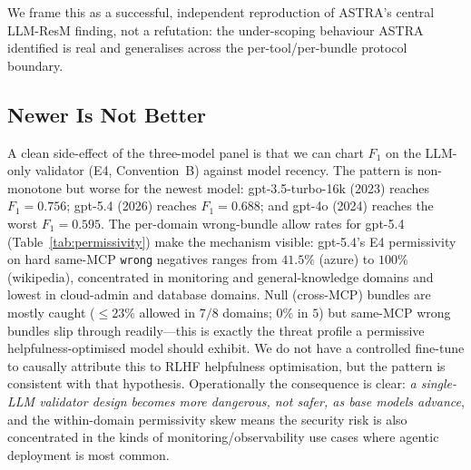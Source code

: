 \documentclass[10pt,a4paper,twocolumn]{article}
\begin{document}
We frame this as a successful, independent reproduction of ASTRA's central LLM-ResM finding, not a refutation: the under-scoping behaviour ASTRA identified is real and generalises across the per-tool/per-bundle protocol boundary.

\subsection{Newer Is Not Better}
\label{sec:newer_not_better}

A clean side-effect of the three-model panel is that we can chart $F_1$ on the LLM-only validator (E4, Convention~B) against model recency. The pattern is non-monotone but worse for the newest model: gpt-3.5-turbo-16k (2023) reaches $F_1 = 0.756$; gpt-5.4 (2026) reaches $F_1 = 0.688$; and gpt-4o (2024) reaches the worst $F_1 = 0.595$. The per-domain wrong-bundle allow rates for gpt-5.4 (Table~\ref{tab:permissivity}) make the mechanism visible: gpt-5.4's E4 permissivity on hard same-MCP \texttt{wrong} negatives ranges from $41.5\%$ (azure) to $100\%$ (wikipedia), concentrated in monitoring and general-knowledge domains and lowest in cloud-admin and database domains. Null (cross-MCP) bundles are mostly caught ($\leq 23\%$ allowed in $7/8$ domains; $0\%$ in $5$) but same-MCP wrong bundles slip through readily---this is exactly the threat profile a permissive helpfulness-optimised model should exhibit. We do not have a controlled fine-tune to causally attribute this to RLHF helpfulness optimisation, but the pattern is consistent with that hypothesis. Operationally the consequence is clear: \emph{a single-LLM validator design becomes more dangerous, not safer, as base models advance}, and the within-domain permissivity skew means the security risk is also concentrated in the kinds of monitoring/observability use cases where agentic deployment is most common.
\end{document}
